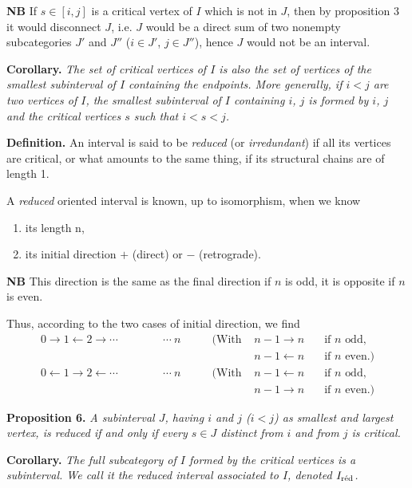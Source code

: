 \textbf{NB} If $s \in [i,j]$ is a critical vertex of $I$ which is not in $J$, then by proposition 3 it would disconnect $J$, i.e. $J$ would be a direct sum of two nonempty subcategories $J'$ and $J''$ ($i \in J'$, $j \in J''$), hence $J$ would not be an interval.


\textbf{Corollary.} \textit{The set of critical vertices of $I$ is also the set of vertices of the smallest subinterval of $I$ containing the endpoints. More generally, if $i < j$ are two vertices of $I$, the smallest subinterval of $I$ containing $i$, $j$ is formed by $i$, $j$ and the critical vertices $s$ such that $i < s < j$.}

\textbf{Definition.} An interval is said to be \textit{reduced} (or \textit{irredundant}) if all its vertices are critical, or what amounts to the same thing, if its structural chains are of length 1.

A \textit{reduced} oriented interval is known, up to isomorphism, when we know
\begin{enumerate}
\item[a)] its length $\mathrm{n}$,
\item[b)] its initial direction $+$ (direct) or $-$ (retrograde).
\end{enumerate}

\textbf{NB} This direction is the same as the final direction if $n$ is odd, it is opposite if $n$ is even.

Thus, according to the two cases of initial direction, we find
\[
\begin{aligned}
0 \longrightarrow 1 \longleftarrow 2 \longrightarrow \cdots \qquad\qquad \cdots\ n & \qquad (\text{With } & n-1 \longrightarrow n & \quad \text{if } n \text{ odd,}\\
& & n-1 \longleftarrow n & \quad \text{if } n \text{ even.)}\\
0 \longleftarrow 1 \longrightarrow 2 \longleftarrow \cdots \qquad\qquad \cdots\ n & \qquad (\text{With } & n-1 \longleftarrow n & \quad \text{if } n \text{ odd,}\\
& & n-1 \longrightarrow n & \quad \text{if } n \text{ even.)}
\end{aligned}
\]


\textbf{Proposition 6.} \textit{A subinterval $J$, having $i$ and $j$ ($i < j$) as smallest and largest vertex, is reduced if and only if every $s \in J$ distinct from $i$ and from $j$ is critical.}

\textbf{Corollary.} \textit{The full subcategory of $I$ formed by the critical vertices is a subinterval. We call it the reduced interval associated to $I$, denoted $I_{\textup{réd}}$.}